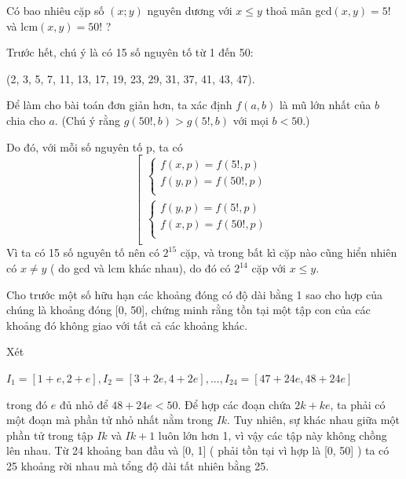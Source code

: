 \begin{baitap}
  Có bao nhiêu cặp số $(x;y)$ nguyên dương với $x \le y$ thoả mãn gcd$(x,y) = 5!$ và lcm$(x,y) = 50!$ ?

\begin{loigiai3}   
Trước hết, chú ý là có 15 số nguyên tố từ 1 đến 50:

(2, 3, 5, 7, 11, 13, 17, 19, 23, 29, 31, 37, 41, 43, 47).

Để làm cho bài toán đơn giản hơn, ta xác định $f(a,b)$ là mũ lớn nhất của $b$ chia cho $a$. (Chú ý rằng $g(50!, b) > g(5!,b)$ với mọi $b < 50$.)

Do đó, với mỗi số nguyên tố p, ta có 
\[
\left[ \begin{array}{l}
 \left\{ \begin{array}{l}
 f\left( {x,p} \right) = f\left( {5!,p} \right) \\ 
 f\left( {y,p} \right) = f\left( {50!,p} \right) \\ 
 \end{array} \right. \\ 
 \left\{ \begin{array}{l}
 f\left( {y,p} \right) = f\left( {5!,p} \right) \\ 
 f\left( {x,p} \right) = f\left( {50!,p} \right) \\ 
 \end{array} \right. \\ 
 \end{array} \right.
\]
Vì ta có 15 số nguyên tố nên có $2^{15} $ cặp, và trong bất kì cặp nào cũng hiển nhiên có $x \ne y$ ( do gcd và lcm khác nhau), do đó có  $2^{14} $ cặp với $x \le y$.
\end{loigiai3}
\end{baitap}


\begin{baitap}
Cho trước một số hữu hạn các khoảng đóng có độ dài bằng 1 sao cho hợp của chúng là khoảng đóng [0,  50], chứng minh rằng tồn tại một tập con của các khoảng đó không giao với tất cả các khoảng khác.

\begin{loigiai3}
 Xét 

$I_1  = \left[ {1 + e,2 + e} \right],I_2  = \left[ {3 + 2e,4 + 2e} \right],...,I_{24}  = \left[ {47 + 24e,48 + 24e} \right]$

trong đó $e$ đủ nhỏ để $48 + 24e < 50$. Để hợp các đoạn chứa $2k + ke$, ta phải có một đoạn mà phần tử nhỏ nhất nằm trong $Ik$. Tuy nhiên, sự khác nhau giữa một phần tử trong tập $Ik$ và $Ik+1$ luôn lớn hơn 1, vì vậy các tập này không chồng lên nhau.
Từ 24 khoảng ban đầu và [0, 1] ( phải tồn tại vì hợp là [0, 50] ) ta có 25 khoảng rời nhau mà tổng độ dài tất nhiên bằng 25.
\end{loigiai3}
\end{baitap}

